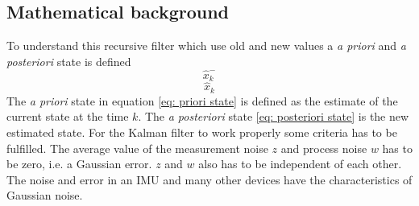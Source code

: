 \documentclass[a4paper,11pt]{kth-mag}
\begin{document}
\subsection{Mathematical background}
To understand this recursive filter which use old and new values a \textit{a priori} and \textit{a posteriori} state is defined
\begin{equation} \label{eq: priori state}
\hat{x}^-_k
\end{equation}
\begin{equation} \label{eq: posteriori state}
\hat{x}_k
\end{equation}
The \textit{a priori}  state in equation \eqref{eq: priori state} is defined as the estimate of the current state at the time $k$. The \textit{a posteriori} state \eqref{eq: posteriori state} is the new estimated state.
For the Kalman filter to work properly some criteria has to be fulfilled. The average value of the measurement noise $z$ and process noise $w$ has to be zero, i.e. a Gaussian error. $z$ and $w$ also has to be independent of  each other. The noise and error in an IMU and many other devices have the characteristics of Gaussian noise.
\end{document}
